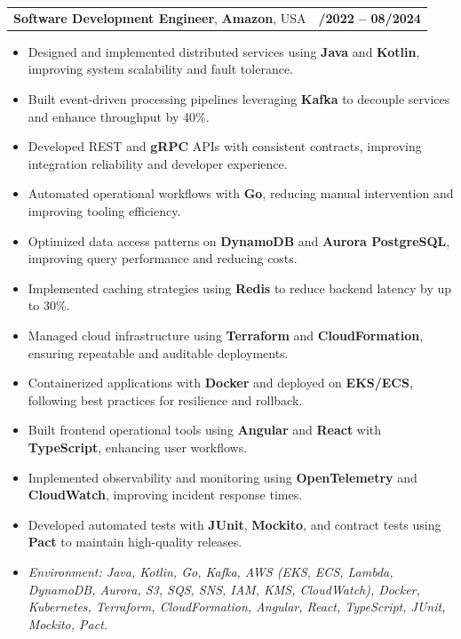 \documentclass[letterpaper,11pt]{article}
\makeatletter
\newcommand{\resumeItem}[1]{
  \item\footnotesize{
    {#1 \vspace{-2pt}}
  }
}
\newcommand{\resumeSubheading}[4]{
  \vspace{-2pt}\item
    \begin{tabular*}{1.0\textwidth}[t]{l@{\extracolsep{\fill}}r}
      \textbf{\fontsize{10pt}{14pt}\selectfont #3}, \textbf{\fontsize{10pt}{14pt}\selectfont #1}, \fontsize{10pt}{14pt}\selectfont #4 & \textbf{\fontsize{10pt}{14pt}\selectfont #2} \\
    \end{tabular*}\vspace{-7pt}
}
\newcommand{\resumeItemListStart}{\begin{itemize}[leftmargin=*]}
\newcommand{\resumeItemListEnd}{\end{itemize}\vspace{-5pt}}
\makeatother
\begin{document}
\resumeSubheading
{Amazon}{10/2022 -- 08/2024}
{Software Development Engineer}{USA}
\resumeItemListStart
  \resumeItem{Designed and implemented distributed services using \textbf{Java} and \textbf{Kotlin}, improving system scalability and fault tolerance.}
  \resumeItem{Built event-driven processing pipelines leveraging \textbf{Kafka} to decouple services and enhance throughput by 40\%.}
  \resumeItem{Developed REST and \textbf{gRPC} APIs with consistent contracts, improving integration reliability and developer experience.}
  \resumeItem{Automated operational workflows with \textbf{Go}, reducing manual intervention and improving tooling efficiency.}
  \resumeItem{Optimized data access patterns on \textbf{DynamoDB} and \textbf{Aurora PostgreSQL}, improving query performance and reducing costs.}
  \resumeItem{Implemented caching strategies using \textbf{Redis} to reduce backend latency by up to 30\%.}
  \resumeItem{Managed cloud infrastructure using \textbf{Terraform} and \textbf{CloudFormation}, ensuring repeatable and auditable deployments.}
  \resumeItem{Containerized applications with \textbf{Docker} and deployed on \textbf{EKS/ECS}, following best practices for resilience and rollback.}
  \resumeItem{Built frontend operational tools using \textbf{Angular} and \textbf{React} with \textbf{TypeScript}, enhancing user workflows.}
  \resumeItem{Implemented observability and monitoring using \textbf{OpenTelemetry} and \textbf{CloudWatch}, improving incident response times.}
  \resumeItem{Developed automated tests with \textbf{JUnit}, \textbf{Mockito}, and contract tests using \textbf{Pact} to maintain high-quality releases.}
  \resumeItem{\textit{Environment: Java, Kotlin, Go, Kafka, AWS (EKS, ECS, Lambda, DynamoDB, Aurora, S3, SQS, SNS, IAM, KMS, CloudWatch), Docker, Kubernetes, Terraform, CloudFormation, Angular, React, TypeScript, JUnit, Mockito, Pact.}}
\resumeItemListEnd
\end{document}
